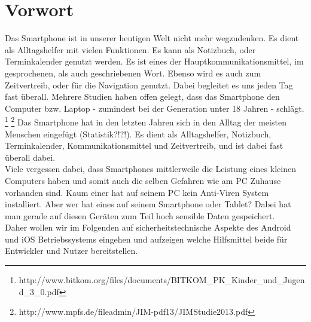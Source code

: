 \section{Vorwort}
	Das Smartphone ist in unserer heutigen Welt nicht mehr wegzudenken. Es dient
	als Alltagshelfer mit vielen Funktionen. Es kann als Notizbuch, oder
	Terminkalender genutzt werden. Es ist eines der Hauptkommunikationsmittel, im
	gesprochenen, als auch geschriebenen Wort. Ebenso wird es auch zum
	Zeitvertreib, oder für die Navigation genutzt. Dabei begleitet es uns jeden
	Tag fast überall.
	Mehrere Studien haben offen gelegt, dass das Smartphone den Computer bzw. Laptop - zumindest bei der
	Generation unter 18 Jahren - schlägt.
	\footnote{http://www.bitkom.org/files/documents/BITKOM\_PK\_Kinder\_und\_Jugend\_3\_0.pdf}
	\footnote{http://www.mpfs.de/fileadmin/JIM-pdf13/JIMStudie2013.pdf}
	Das Smartphone hat in den letzten Jahren sich in den Alltag der meisten
	Menschen eingefügt (Statistik?!?!).  Es dient als Alltagshelfer, Notizbuch, 
	Terminkalender, Kommunikationsmittel und Zeitvertreib, und ist dabei fast überall dabei.\\
	Viele vergessen dabei, dass Smartphones mittlerweile die Leistung eines kleinen
	Computers haben und somit auch die selben Gefahren wie am PC Zuhause vorhanden sind.
	Kaum einer hat auf seinem PC kein Anti-Viren System installiert. Aber wer hat
	eines auf seinem Smartphone oder Tablet? Dabei hat man gerade auf diesen Geräten zum Teil 
	hoch sensible Daten gespeichert.\\
	Daher wollen wir im Folgenden auf sicherheitstechnische Aspekte des Android und
	iOS Betriebssystems eingehen und aufzeigen welche Hilfsmittel beide für
	Entwickler und Nutzer bereitstellen.
